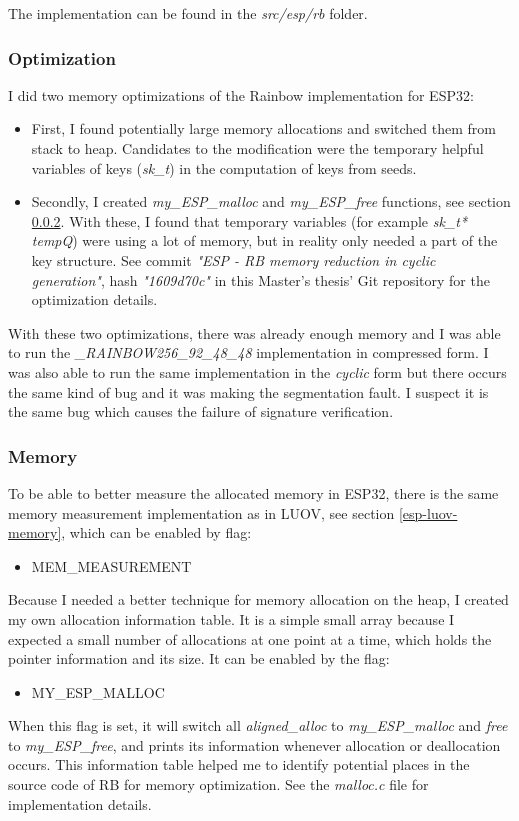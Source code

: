 \documentclass[thesis=M,english]{FITthesis}[2019/12/23]
\begin{document}
\bigskip
\noindent
The implementation can be found in the \textit{src/esp/rb} folder.

\subsubsection{Optimization} \label{rb-opti}
I did two memory optimizations of the Rainbow implementation for ESP32:
\begin{itemize}
\item	First, I found potentially large memory allocations and switched them from stack to heap. Candidates to the modification were the temporary helpful variables of keys (\textit{sk\_t}) in the computation of keys from seeds.

\item	Secondly, I created \textit{my\_ESP\_malloc} and \textit{my\_ESP\_free} functions, see section \ref{esp-rb-memory}. With these, I found that temporary variables (for example \textit{sk\_t* tempQ}) were using a lot of memory, but in reality only needed a part of the key structure. See commit \textit{"ESP - RB memory reduction in cyclic generation"}, hash \textit{"1609d70c"} in this Master's thesis' Git repository for the optimization details.
\end{itemize}
With these two optimizations, there was already enough memory and I was able to run the \textit{\_RAINBOW256\_92\_48\_48} implementation in compressed form. I was also able to run the same implementation in the \textit{cyclic} form but there occurs the same kind of bug and it was making the segmentation fault. I suspect it is the same bug which causes the failure of signature verification.

\subsubsection{Memory} \label{esp-rb-memory}
To be able to better measure the allocated memory in ESP32, there is the same memory measurement implementation as in LUOV, see section \ref{esp-luov-memory}, which can be enabled by flag:
\begin{itemize}
\item	MEM\_MEASUREMENT
\end{itemize}
Because I needed a better technique for memory allocation on the heap, I created my own allocation information table. It is a simple small array because I expected a small number of allocations at one point at a time, which holds the pointer information and its size.
It can be enabled by the flag:
\begin{itemize}
\item	MY\_ESP\_MALLOC
\end{itemize}
When this flag is set, it will switch all \textit{aligned\_alloc} to \textit{my\_ESP\_malloc} and \textit{free} to \textit{my\_ESP\_free}, and prints its information whenever allocation or deallocation occurs.
This information table helped me to identify potential places in the source code of RB for memory optimization. See the \textit{malloc.c} file for implementation details.
\end{document}
